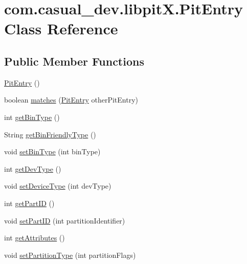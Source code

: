 \hypertarget{classcom_1_1casual__dev_1_1libpitX_1_1PitEntry}{\section{com.\-casual\-\_\-dev.\-libpit\-X.\-Pit\-Entry Class Reference}
\label{classcom_1_1casual__dev_1_1libpitX_1_1PitEntry}
}
\subsection*{Public Member Functions}
\begin{DoxyCompactItemize}
\item 
\hyperlink{classcom_1_1casual__dev_1_1libpitX_1_1PitEntry_a25456f5b2f43f08b9f461bd5623cbae7}{Pit\-Entry} ()
\item 
boolean \hyperlink{classcom_1_1casual__dev_1_1libpitX_1_1PitEntry_a87f92a1670bbeae0b5519b6db6260e9c}{matches} (\hyperlink{classcom_1_1casual__dev_1_1libpitX_1_1PitEntry}{Pit\-Entry} other\-Pit\-Entry)
\item 
int \hyperlink{classcom_1_1casual__dev_1_1libpitX_1_1PitEntry_ac26349dab56ffe55905fbe30119a5c94}{get\-Bin\-Type} ()
\item 
String \hyperlink{classcom_1_1casual__dev_1_1libpitX_1_1PitEntry_a0c0831d51cf860c384dd27bf443e3bc4}{get\-Bin\-Friendly\-Type} ()
\item 
void \hyperlink{classcom_1_1casual__dev_1_1libpitX_1_1PitEntry_a12c350ee45c1e045a8f6b79d4eb66079}{set\-Bin\-Type} (int bin\-Type)
\item 
int \hyperlink{classcom_1_1casual__dev_1_1libpitX_1_1PitEntry_adc7d44583bb9dc69507bcc6c3863a3e0}{get\-Dev\-Type} ()
\item 
void \hyperlink{classcom_1_1casual__dev_1_1libpitX_1_1PitEntry_aafa6f536d4269ff2dc9e8c665fbc3f1d}{set\-Device\-Type} (int dev\-Type)
\item 
int \hyperlink{classcom_1_1casual__dev_1_1libpitX_1_1PitEntry_ab2890a70a53004e54c8f26b65592e08a}{get\-Part\-I\-D} ()
\item 
void \hyperlink{classcom_1_1casual__dev_1_1libpitX_1_1PitEntry_ad668b5a31a41b3258a36a7372be09c26}{set\-Part\-I\-D} (int partition\-Identifier)
\item 
int \hyperlink{classcom_1_1casual__dev_1_1libpitX_1_1PitEntry_a368b9be8bad512154d71d072d56fede4}{get\-Attributes} ()
\item 
void \hyperlink{classcom_1_1casual__dev_1_1libpitX_1_1PitEntry_a51c79849ed9e8603fdfa10e8f8574a5f}{set\-Partition\-Type} (int partition\-Flags)

\end{DoxyCompactItemize}
